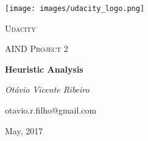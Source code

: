 \documentclass[12pt, a4paper]{article}
\begin{document}
	
\pagestyle{plain}

\begin{titlepage}
\centering
\texttt{[image: images/udacity\_logo.png]}\par\vspace{1cm}
{\scshape\LARGE Udacity \par}
\vspace{1cm}
{\scshape\Large AIND Project 2\par}
\vspace{1.5cm}
{\huge\bfseries Heuristic Analysis\par}
\vspace{2cm}
{\Large\itshape Otávio Vicente Ribeiro\par}
{\large\ttfamily otavio.r.filho@gmail.com\par}

\vfill

{May, 2017\par}
\end{titlepage}	

\tableofcontents
\newpage
{}









\appendix




\end{document}
